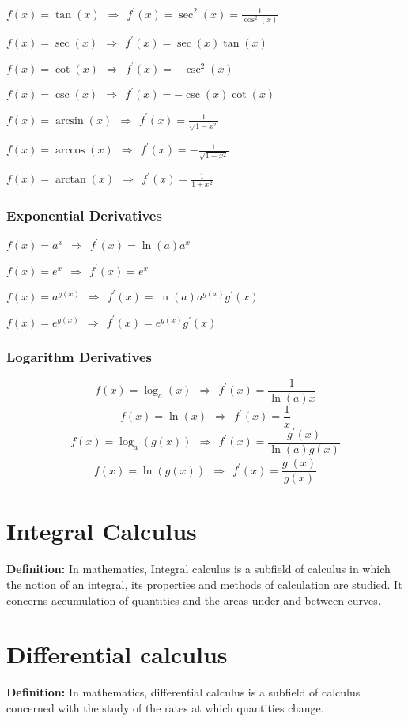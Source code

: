 $ f(x)=\tan(x) ~~ \Rightarrow ~~ f^\prime(x)=\sec^2(x)= \frac{1}{\cos^2(x)} $

$ f(x)=\sec(x) ~~ \Rightarrow ~~ f^\prime(x)=\sec(x)\tan(x) $

$ f(x)=\cot(x) ~~ \Rightarrow ~~ f^\prime(x)=-\csc^2(x) $

$ f(x)=\csc(x) ~~ \Rightarrow ~~ f^\prime(x)=-\csc(x)\cot(x) $

$ f(x)=\arcsin(x) ~~ \Rightarrow ~~ f^\prime(x)= \frac{1}{ \sqrt{1-x^2} } $

$ f(x)=\arccos(x) ~~ \Rightarrow ~~ f^\prime(x)= -\frac{1}{ \sqrt{1-x^2} } $

$ f(x)=\arctan(x) ~~ \Rightarrow ~~ f^\prime(x)= \frac{1}{ 1+x^2 } $

\subsubsection{Exponential Derivatives}
$ f(x)=a^x ~~ \Rightarrow ~~ f^\prime(x)=\ln(a)a^x $

$ f(x)=e^x ~~ \Rightarrow ~~ f^\prime(x)=e^x $

$ f(x)=a^{g(x)} ~~ \Rightarrow ~~ f^\prime(x)=\ln(a)a^{g(x)}g^\prime(x) $

$ f(x)=e^{g(x)} ~~ \Rightarrow ~~ f^\prime(x)=e^{g(x)}g^\prime(x) $

\subsubsection{Logarithm Derivatives}
\[ f(x)=\log_a(x) ~~ \Rightarrow ~~ f^\prime(x)= \frac{1}{ \ln(a)x } \]
\[ f(x)=\ln(x) ~~ \Rightarrow ~~ f^\prime(x)= \frac{1}{ x } \]
\[ f(x)=\log_a(g(x)) ~~ \Rightarrow ~~ f^\prime(x)= \frac{g^\prime(x)}{ \ln(a)g(x) } \]
\[ f(x)=\ln(g(x)) ~~ \Rightarrow ~~ f^\prime(x)= \frac{g^\prime(x)}{ g(x) } \]


\section{Integral Calculus}
\textbf{Definition:} In mathematics, Integral calculus is a subfield of calculus in which the notion of an integral, its properties and methods of calculation are studied. It concerns accumulation of quantities and the areas under and between curves.


\section{Differential calculus}
\textbf{Definition:} In mathematics, differential calculus is a subfield of calculus concerned with the study of the rates at which quantities change.

